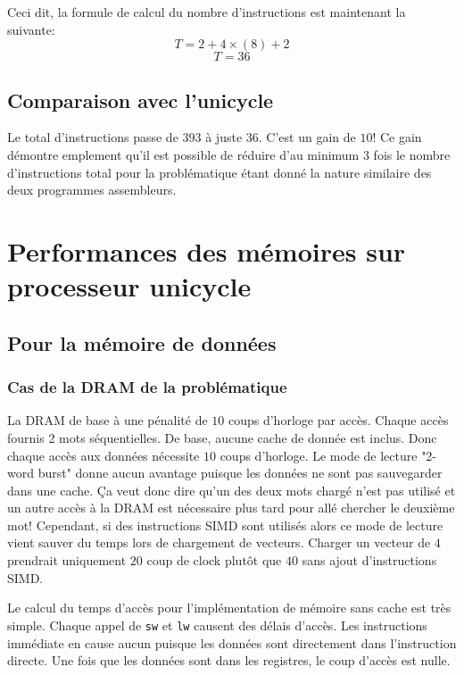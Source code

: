 \documentclass[a11paper]{article}
\newcommand{\todo}[1]{\begin{color}{Red}\textbf{TODO:} #1\end{color}}
\begin{document}
Ceci dit, la formule de calcul du nombre d'instructions est maintenant la suivante:
$$
T = 2 + 4\times(8) + 2
$$
$$
T = 36
$$

\subsection{Comparaison avec l'unicycle}
Le total d'instructions passe de $393$ à juste $36$. C'est un gain de $10$! Ce
gain démontre emplement qu'il est possible de réduire d'au minimum $3$ fois le
nombre d'instructions total pour la problématique étant donné la nature
similaire des deux programmes assembleurs.






\section{Performances des mémoires sur processeur unicycle}
\subsection{Pour la mémoire de données}
\subsubsection{Cas de la DRAM de la problématique}

La DRAM de base à une pénalité de $10$ coups d'horloge par accès. Chaque accès
fournis 2 mots séquentielles. De base, aucune cache de donnée est inclus.
Donc chaque accès aux données nécessite $10$ coups d'horloge. Le mode de
lecture "2-word burst" donne aucun avantage puisque les données ne sont pas
sauvegarder dans une cache. Ça veut donc dire qu'un des deux mots chargé
n'est pas utilisé et un autre accès à la DRAM est nécessaire plus tard pour
allé chercher le deuxième mot! Cependant, si des instructions SIMD sont
utilisés alors ce mode de lecture vient sauver du temps lors de chargement de
vecteurs. Charger un vecteur de $4$ prendrait uniquement $20$ coup de clock
plutôt que $40$ sans ajout d'instructions SIMD.

Le calcul du temps d'accès pour l'implémentation de mémoire sans cache est très
simple. Chaque appel de \verb|sw| et \verb|lw| causent des délais d'accès.
Les instructions immédiate en cause aucun puisque les données sont directement
dans l'instruction directe. Une fois que les données sont dans les registres,
le coup d'accès est nulle.
\end{document}
